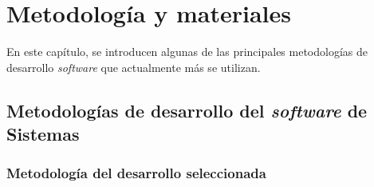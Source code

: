 \chapter{Metodología y materiales}
\label{chapter:metodologia}

En este capítulo, se introducen algunas de las principales metodologías de desarrollo \textit{software} que actualmente más se utilizan.

\section{Metodologías de desarrollo del \textit{software} de Sistemas}

\subsection*{Metodología del desarrollo seleccionada}


